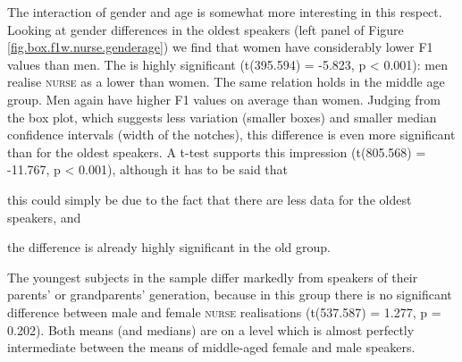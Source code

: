 The interaction of gender and age is somewhat more interesting in this respect.
Looking at gender differences in the oldest speakers (left panel of Figure \ref{fig.box.f1w.nurse.genderage}) we find that women have considerably lower F1 values than men.
The  is highly significant (t(395.594) = -5.823, p < 0.001): men realise \textsc{nurse} as a lower  than women.
The same relation holds in the middle age group.
Men again have higher F1 values on average than women.
Judging from the box plot, which suggests less variation (smaller boxes) and smaller median confidence intervals (width of the notches), this difference is even more significant than for the oldest speakers.
A t-test supports this impression (t(805.568) = -11.767, p < 0.001), although it has to be said that
\begin{inparaenum}[(a)]
	\item this could simply be due to the fact that there are less data for the oldest speakers, and
	\item the difference is already highly significant in the old group.
\end{inparaenum}
The youngest subjects in the sample differ markedly from speakers of their parents' or grandparents' generation, because in this group there is no significant difference between male and female \textsc{nurse} realisations (t(537.587) = 1.277, p = 0.202).
Both means (and medians) are on a level which is almost perfectly intermediate between the means of middle-aged female and male speakers.

